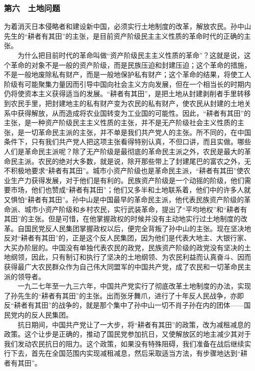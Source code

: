 \documentclass[cn,11pt,chinese]{elegantbook}
\def\myformat#1{\hfil\hfil #1}
\begin{document}
\subsubsection*{\myformat{第六　土地问题}}
为着消灭日本侵略者和建设新中国，必须实行土地制度的改革，解放农民。孙中山先生的“耕者有其田”的主张，是目前资产阶级民主主义性质的革命时代的正确的主张。\\
　　为什么把目前时代的革命叫做“资产阶级民主主义性质的革命”？这就是说，这个革命的对象不是一般的资产阶级，而是民族压迫和封建压迫；这个革命的措施，不是一般地废除私有财产，而是一般地保护私有财产；这个革命的结果，将使工人阶级有可能聚集力量因而引导中国向社会主义方向发展，但在一个相当长的时期内仍将使资本主义获得适当的发展。“耕者有其田”，是把土地从封建剥削者手里转移到农民手里，把封建地主的私有财产变为农民的私有财产，使农民从封建的土地关系中获得解放，从而造成将农业国转变为工业国的可能性。因此，“耕者有其田”的主张，是一种资产阶级民主主义性质的主张，并不是无产阶级社会主义性质的主张，是一切革命民主派的主张，并不单是我们共产党人的主张。所不同的，在中国条件下，只有我们共产党人把这项主张看得特别认真，不但口讲，而且实做。哪些人们是革命民主派呢？除了无产阶级是最彻底的革命民主派之外，农民是最大的革命民主派。农民的绝对大多数，就是说，除开那些带上了封建尾巴的富农之外，无不积极地要求“耕者有其田”。城市小资产阶级也是革命民主派，“耕者有其田”使农业生产力获得发展，对于他们是有利的。民族资产阶级是一个动摇的阶级，他们需要市场，他们也赞成“耕者有其田”；他们又多半和土地联系着，他们中的许多人就又惧怕“耕者有其田”。孙中山是中国最早的革命民主派，他代表民族资产阶级的革命派、城市小资产阶级和乡村农民，实行武装革命，提出了“平均地权”和“耕者有其田”的主张。但是可惜，在他掌握政权的时候并没有主动地实行过土地制度的改革。自国民党反人民集团掌握政权以后，便完全背叛了孙中山的主张。现在坚决地反对“耕者有其田”的，正是这个反人民集团，因为他们是代表大地主、大银行家、大买办阶层的。中国没有单独代表农民的政党，民族资产阶级的政党没有坚决的土地纲领，因此，只有制订和执行了坚决的土地纲领、为农民利益而认真奋斗、因而获得最广大农民群众作为自己伟大同盟军的中国共产党，成了农民和一切革命民主派的领导者。\\
　　一九二七年至一九三六年，中国共产党实行了彻底改革土地制度的办法，实现了孙先生的“耕者有其田”的主张。出而张牙舞爪，进行了十年反人民战争，亦即反“耕者有其田”的战争的，就是那个集中了孙中山一切不肖子孙在内的团体——国民党内的反人民集团。\\
　　抗日期间，中国共产党让了一大步，将“耕者有其田”的政策，改为减租减息的政策。这个让步是正确的，推动了国民党参加抗日，又使解放区的地主减少其对于我们发动农民抗日的阻力。这个政策，如果没有特殊阻碍，我们准备在战后继续实行下去，首先在全国范围内实现减租减息，然后采取适当方法，有步骤地达到“耕者有其田”。\\
\end{document}
